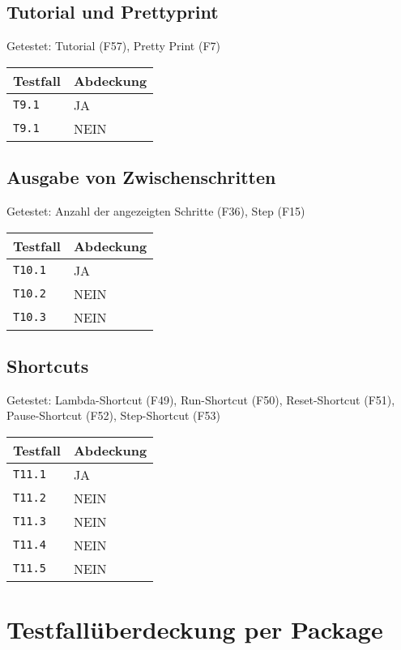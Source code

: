 \documentclass[parskip=full,11pt,twoside]{scrartcl}
\newcommand{\testline}[2]{
    \texttt{#1} & \ifthenelse{\equal{#2}{JA}}{\cellcolor{green!20}}{\cellcolor{red!20}}#2 \\ \hline
}
\begin{document}
\subsection{Tutorial und Prettyprint}
    Getestet:
    Tutorial (F57),
    Pretty Print (F7)

    \label{shortcuts}
    \begin{center}
        \begin{tabular}{ p{9cm} p{4cm}}
            Testfall & Abdeckung \\ \hline
            \testline{T9.1}{JA}
            \testline{T9.1}{NEIN}
        \end{tabular}
    \end{center}

\subsection{Ausgabe von Zwischenschritten}
    Getestet:
    Anzahl der angezeigten Schritte (F36),
    Step (F15)

    \label{shortcuts}
    \begin{center}
        \begin{tabular}{ p{9cm} p{4cm}}
            Testfall & Abdeckung \\ \hline
            \testline{T10.1}{JA}
            \testline{T10.2}{NEIN}
            \testline{T10.3}{NEIN}
        \end{tabular}
    \end{center}

\subsection{Shortcuts}
    Getestet:
    Lambda-Shortcut (F49),
    Run-Shortcut (F50),
    Reset-Shortcut (F51),
    Pause-Shortcut (F52),
    Step-Shortcut (F53)

    \label{shortcuts}
    \begin{center}
        \begin{tabular}{ p{9cm} p{4cm}}
            Testfall & Abdeckung \\ \hline
            \testline{T11.1}{JA}
            \testline{T11.2}{NEIN}
            \testline{T11.3}{NEIN}
            \testline{T11.4}{NEIN}
            \testline{T11.5}{NEIN}
        \end{tabular}
    \end{center}

\section{Testfallüberdeckung per Package}
\end{document}
